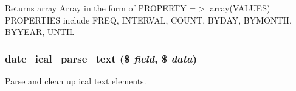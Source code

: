 \begin{DoxyReturn}{Returns}
array Array in the form of PROPERTY =$>$ array(VALUES) PROPERTIES include FREQ, INTERVAL, COUNT, BYDAY, BYMONTH, BYYEAR, UNTIL 
\end{DoxyReturn}
\hypertarget{date__api__ical_8inc_ae0b819676bd9cec8f5a6a8d71b82c117}{
\subsubsection[{date\_\-ical\_\-parse\_\-text}]{\setlength{\rightskip}{0pt plus 5cm}date\_\-ical\_\-parse\_\-text (\$ {\em field}, \/  \$ {\em data})}}
\label{date__api__ical_8inc_ae0b819676bd9cec8f5a6a8d71b82c117}
Parse and clean up ical text elements. 